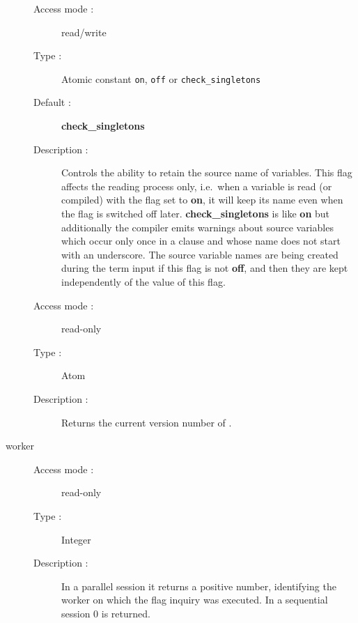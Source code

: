 \begin{description}
\begin{description}
\item[Access mode : ] read/write
\item[Type : ] Atomic constant {\tt on}, {\tt off} or {\tt check_singletons}
\item[Default : ] {\bf check_singletons}
\item[Description : ] Controls the ability to retain the source name of
variables. This flag affects the reading process only, i.e.\ when a variable
is read (or compiled) with the flag set to {\bf on}, it will keep its name
even when the flag is switched off later.
{\bf check_singletons} is like {\bf on} but additionally the compiler emits
warnings about source variables which occur only once in a clause
and whose name does not start with an underscore.
The source variable names are being created
during the term input if this flag is not {\bf off},
and then they are kept independently of the value of this flag.
\end{description}

\begin{description}
\item[Access mode : ] read-only 
\item[Type : ] Atom 
\item[Description : ] Returns the current version number of {\eclipse}.
\end{description}

\item[worker]
\begin{description}
\item[Access mode : ] read-only
\item[Type : ] Integer
\item[Description : ] In a parallel session it returns a positive number,
identifying the worker on which the flag inquiry was executed.
In a sequential session 0 is returned.
\end{description}

\end{description}
